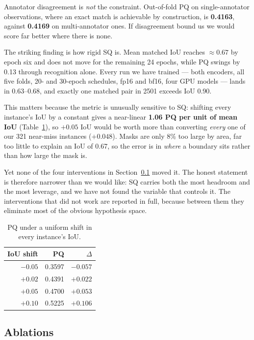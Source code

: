 Annotator disagreement is \emph{not} the constraint. Out-of-fold PQ on
single-annotator observations, where an exact match is achievable by
construction, is \textbf{0.4163}, against \textbf{0.4169} on multi-annotator
ones. If disagreement bound us we would score far better where there is none.

The striking finding is how rigid SQ is. Mean matched IoU reaches $\approx 0.67$
by epoch six and does not move for the remaining 24 epochs, while PQ swings by
0.13 through recognition alone. Every run we have trained --- both encoders, all
five folds, 20- and 30-epoch schedules, fp16 and bf16, four GPU models --- lands
in 0.63--0.68, and exactly one matched pair in 2501 exceeds IoU 0.90.

This matters because the metric is unusually sensitive to SQ: shifting every
instance's IoU by a constant gives a near-linear \textbf{1.06 PQ per unit of mean
IoU} (Table~\ref{tab:headroom}), so $+0.05$ IoU would be worth more than
converting \emph{every} one of our 321 near-miss instances ($+0.048$). Masks are
only 8\% too large by area, far too little to explain an IoU of 0.67, so the
error is in \emph{where} a boundary sits rather than how large the mask is.

Yet none of the four interventions in Section~\ref{sec:ablations} moved it. The
honest statement is therefore narrower than we would like: SQ carries both the
most headroom and the most leverage, and we have not found the variable that
controls it. The interventions that did not work are reported in full, because
between them they eliminate most of the obvious hypothesis space.

\begin{table}[t]
\centering
\caption{PQ under a uniform shift in every instance's IoU.}
\label{tab:headroom}
\begin{tabular}{rrr}
\toprule
IoU shift & PQ & $\Delta$ \\
\midrule
$-0.05$ & 0.3597 & $-0.057$ \\
$+0.02$ & 0.4391 & $+0.022$ \\
$+0.05$ & 0.4700 & $+0.053$ \\
$+0.10$ & 0.5225 & $+0.106$ \\
\bottomrule
\end{tabular}
\end{table}

\subsection{Ablations}
\label{sec:ablations}

